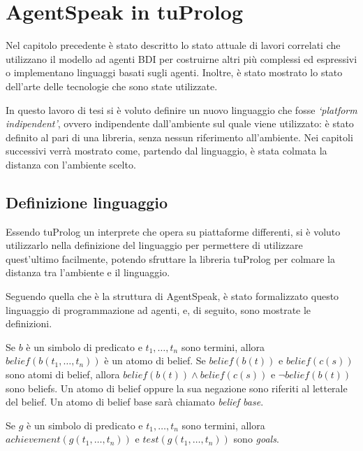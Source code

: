 \chapter{AgentSpeak in tuProlog}
Nel capitolo precedente è stato descritto lo stato attuale di lavori correlati che utilizzano il modello ad agenti BDI per costruirne altri più complessi ed espressivi o implementano linguaggi basati sugli agenti. Inoltre, è stato mostrato lo stato dell'arte delle tecnologie che sono state utilizzate.

In questo lavoro di tesi si è voluto definire un nuovo linguaggio che fosse \textit{`platform indipendent'}, ovvero indipendente dall'ambiente sul quale viene utilizzato: è stato definito al pari di una libreria, senza nessun riferimento all'ambiente. Nei capitoli successivi verrà mostrato come, partendo dal linguaggio, è stata colmata la distanza con l'ambiente scelto.

\section{Definizione linguaggio}\label{sctn:definizioneLinguaggio}
Essendo tuProlog un interprete che opera su piattaforme differenti, si è voluto utilizzarlo nella definizione del linguaggio per permettere di utilizzare quest'ultimo facilmente, potendo sfruttare la libreria tuProlog per colmare la distanza tra l'ambiente e il linguaggio.

Seguendo quella che è la struttura di AgentSpeak, è stato formalizzato questo linguaggio di programmazione ad agenti, e, di seguito, sono mostrate le definizioni.

\smallskip
\begin{defn}
Se $b$ è un simbolo di predicato e $t_1, \ldots, t_n$ sono termini, allora $belief(b(t_1, \ldots, t_n))$ è un atomo di belief.
Se $belief(b(t))$ e $belief(c(s))$ sono atomi di belief, allora $belief(b(t)) \land belief(c(s))$ e $\neg belief(b(t))$ sono beliefs.
Un atomo di belief oppure la sua negazione sono riferiti al letterale del belief. Un atomo di belief base sarà chiamato \textit{belief base}.
\end{defn}

\smallskip
\begin{defn}\label{defn:goals}
Se $g$ è un simbolo di predicato e $t_1, \ldots, t_n$ sono termini, allora $achievement(g(t_1, \ldots, t_n))$ e $test(g(t_1, \ldots, t_n))$ sono \textit{goals}.
\end{defn}

